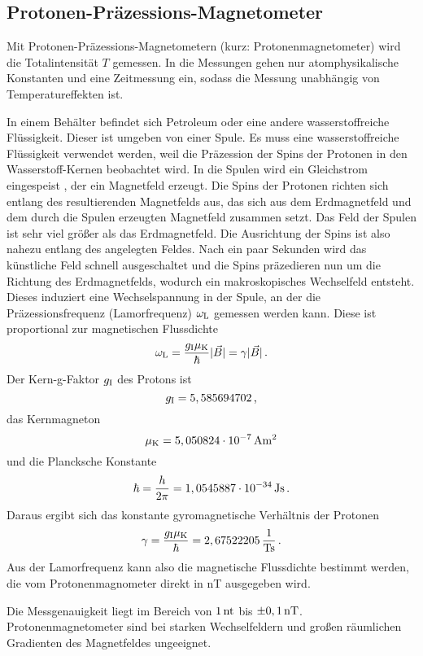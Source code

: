 \subsection{Protonen-Präzessions-Magnetometer}

Mit Protonen-Präzessions-Magnetometern (kurz: Protonenmagnetometer) wird die Totalintensität $T$ gemessen. In die Messungen gehen nur atomphysikalische Konstanten und eine Zeitmessung ein, sodass die Messung unabhängig von Temperatureffekten ist.

In einem Behälter befindet sich Petroleum oder eine andere wasserstoffreiche Flüssigkeit. Dieser ist umgeben von einer Spule. Es muss eine wasserstoffreiche Flüssigkeit verwendet werden, weil die Präzession der Spins der Protonen in den Wasserstoff-Kernen beobachtet wird. In die Spulen wird ein Gleichstrom eingespeist , der ein Magnetfeld erzeugt. Die Spins der Protonen richten sich entlang des resultierenden Magnetfelds aus, das sich aus dem Erdmagnetfeld und dem durch die Spulen erzeugten Magnetfeld zusammen setzt. Das Feld der Spulen ist sehr viel größer als das Erdmagnetfeld. Die Ausrichtung der Spins ist also nahezu entlang des angelegten Feldes. Nach ein paar Sekunden wird das künstliche Feld schnell ausgeschaltet und die Spins präzedieren nun um die Richtung des Erdmagnetfelds, wodurch ein makroskopisches Wechselfeld entsteht. Dieses induziert eine Wechselspannung in der Spule, an der die Präzessionsfrequenz (Lamorfrequenz) $\omega_{\mathrm{L}}$ gemessen werden kann. Diese ist proportional zur magnetischen Flussdichte
\begin{equation}
 \omega_{\mathrm{L}}=\frac{g_{\mathrm{I}}\mu_{\mathrm{K}}}{\hbar}|\vec{B}|=\gamma |\vec{B}| \text{\,.}
\end{equation}
Der Kern-g-Faktor $g_{\mathrm{I}}$ des Protons ist
\begin{equation}
 g_{\mathrm{I}}=5,585694702\text{\,,}
\end{equation}
das Kernmagneton
\begin{equation}
 \mu_{\mathrm{K}}=5,050824\cdot 10^{-7}\,\mathrm{Am^2}
\end{equation}
und die Plancksche Konstante
\begin{equation}
 \hbar=\frac{h}{2\pi}=1,0545887\cdot 10^{-34}\,\mathrm{Js} \text{\,.}
\end{equation}
Daraus ergibt sich das konstante gyromagnetische Verhältnis der Protonen
\begin{equation}
 \gamma=\frac{g_{\mathrm{I}}\mu_{\mathrm{K}}}{\hbar}=2,67522205\,\frac{\mathrm{1}}{\mathrm{Ts}} \text{\,.}
\end{equation}
Aus der Lamorfrequenz kann also die magnetische Flussdichte bestimmt werden, die vom Protonenmagnometer direkt in nT ausgegeben wird.

Die Messgenauigkeit liegt im Bereich von $1\,\mathrm{nt}$ bis $\pm0,1\,\mathrm{nT}$. Protonenmagnetometer sind bei starken Wechselfeldern und großen räumlichen Gradienten des Magnetfeldes ungeeignet.
